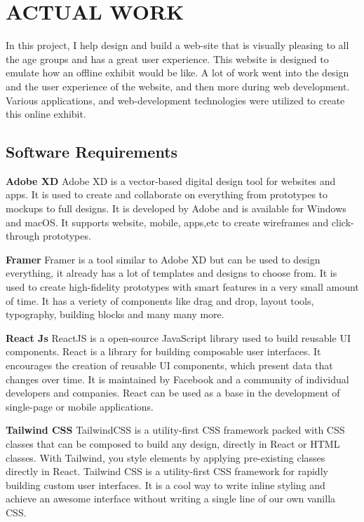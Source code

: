 \chapter{ACTUAL WORK} %
\label{ChapterActualWork} %


In this project, I help design and build a web-site that is visually pleasing to all the age groups and has a great user experience. This website is designed to emulate how an offline exhibit would be like. A lot of work went into the design and the user experience of the website, and then more during web development. Various applications, and web-development technologies were utilized to create this online exhibit. 


\section{Software Requirements}

\textbf{Adobe XD}
Adobe XD is a vector-based digital design tool for websites and apps. It is used to  create and collaborate on everything from prototypes to mockups to full designs. It is developed by Adobe and is available for Windows and macOS. It supports website, mobile, apps,etc to create wireframes and click-through prototypes.

\textbf{Framer}
Framer is a tool similar to Adobe XD but can be used to design everything, it already has a lot of templates and designs to choose from. It is used to create high-fidelity prototypes with smart features in a very small amount of time. It has a veriety of components like drag and drop, layout tools, typography, building blocks and many many more.

\textbf{React Js}
ReactJS is a open-source JavaScript library used to build reusable UI components. React is a library for building composable user interfaces. It encourages the creation of reusable UI components, which present data that changes over time. It is maintained by Facebook and a community of individual developers and companies. React can be used as a base in the development of single-page or mobile applications.


\textbf{Tailwind CSS}
TailwindCSS is a utility-first CSS framework packed with CSS classes that can be composed to build any design, directly in React or HTML classes. With Tailwind, you style elements by applying pre-existing classes directly in React. Tailwind CSS is a utility-first CSS framework for rapidly building custom user interfaces. It is a cool way to write inline styling and achieve an awesome interface without writing a single line of our own vanilla CSS.


